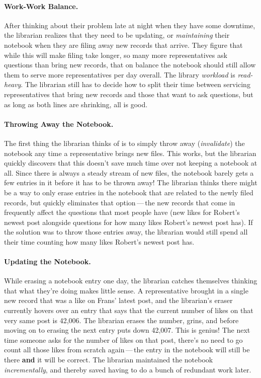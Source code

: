 \paragraph{Work-Work Balance.}
%
After thinking about their problem late at night when they have some downtime,
the librarian realizes that they need to be updating, or \textit{maintaining}
their notebook when they are filing away new records that arrive. They figure
that while this will make filing take longer, so many more representatives ask
questions than bring new records, that on balance the notebook should still
allow them to serve more representatives per day overall. The library
\textit{workload} is \textit{read-heavy}. The librarian still has to decide how
to split their time between servicing representatives that bring new records and
those that want to ask questions, but as long as both lines are shrinking, all
is good.

\paragraph{Throwing Away the Notebook.}
%
The first thing the librarian thinks of is to simply throw away
(\textit{invalidate}) the notebook any time a representative brings new files.
This works, but the librarian quickly discovers that this doesn't save much time
over not keeping a notebook at all. Since there is always a steady stream of new
files, the notebook barely gets a few entries in it before it has to be thrown
away! The librarian thinks there might be a way to only erase entries in the
notebook that are related to the newly filed records, but quickly eliminates
that option\,---\,the new records that come in frequently affect the questions
that most people have (new likes for Robert's newest post alongside questions
for how many likes Robert's newest post has). If the solution was to throw those
entries away, the librarian would still spend all their time counting how many
likes Robert's newest post has.

\paragraph{Updating the Notebook.}
%
While erasing a notebook entry one day, the librarian catches themselves
thinking that what they're doing makes little sense. A representative brought in
a single new record that was a like on Frans' latest post, and the librarian's
eraser currently hovers over an entry that says that the current number of likes
on that very same post is 42,006. The librarian erases the number, grins, and
before moving on to erasing the next entry puts down 42,007. This is genius! The
next time someone asks for the number of likes on that post, there's no need to
go count all those likes from scratch again\,---\,the entry in the notebook will
still be there \textbf{and} it will be correct. The librarian maintained the
notebook \textit{incrementally}, and thereby saved having to do a bunch of
redundant work later.

